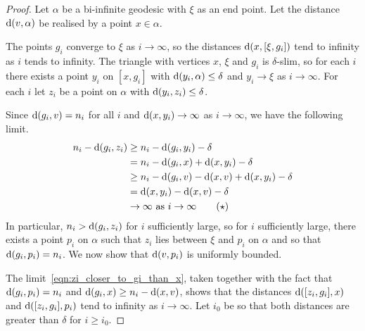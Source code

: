 \documentclass[a4paper]{article}
\begin{document}
\begin{proof}
  Let $\alpha$ be a bi-infinite geodesic with $\xi$ as an end point.  Let the
  distance $\operatorname{d}(v,\alpha)$ be realised by a point $x \in \alpha$.

  The points $g_i$ converge to $\xi$ as $i\to\infty$, so the distances
  $\operatorname{d}(x, [\xi, g_i])$ tend to infinity as $i$ tends to infinity. The
  triangle with vertices $x$, $\xi$ and $g_i$ is $\delta$-slim, so for each $i$
  there exists a point $y_i$ on $[x, g_i]$ with $\operatorname{d}(y_i, \alpha) \leq
  \delta$ and $y_i\to\xi$ as $i\to\infty$.  For each $i$ let $z_i$ be a point
  on $\alpha$ with $\operatorname{d}(y_i, z_i) \leq \delta$.

  Since $\operatorname{d}(g_i, v) = n_i$ for all $i$ and $\operatorname{d}(x,y_i) \to
  \infty$ as $i\to\infty$, we have the following limit.
  \begin{align*}\label{eqn:zi_closer_to_gi_than_x}
    n_i - \operatorname{d}(g_i, z_i) & \geq n_i - \operatorname{d}(g_i, y_i) - \delta \\
                          &= n_i - \operatorname{d}(g_i, x) + \operatorname{d}(x, y_i) - \delta\\
                          &\geq n_i - \operatorname{d}(g_i, v) - \operatorname{d}(x, v) + \operatorname{d}(x,y_i) - \delta\\
                          &= \operatorname{d}(x,y_i) - \operatorname{d}(x,v) - \delta\\
                          &\to \infty\text{ as $i \to \infty$}\tag{$\star$}
  \end{align*}
  In particular, $n_i > \operatorname{d}(g_i, z_i)$ for $i$ sufficiently large, so for
  $i$ sufficiently large, there exists a point $p_i$ on $\alpha$
  such that $z_i$ lies between $\xi$ and $p_i$ on $\alpha$ and so that
  $\operatorname{d}(g_i,p_i)=n_i$. We now show that $\operatorname{d}(v, p_i)$ is uniformly bounded.

  The limit~\eqref{eqn:zi_closer_to_gi_than_x}, taken together with the fact
  that $\operatorname{d}(g_i, p_i) = n_i$ and $\operatorname{d}(g_i, x) \geq n_i - \operatorname{d}(x, v)$,
  shows that the distances $\operatorname{d}([z_i, g_i], x)$ and $\operatorname{d}([z_i, g_i], p_i)$
  tend to infinity as $i\to\infty$. Let $i_0$ be so that both distances are
  greater than $\delta$ for $i\geq i_0$.


\end{proof}
\end{document}
